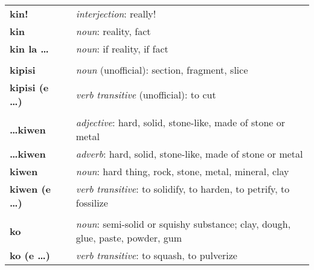 \begin{supertabular}{p{2,5cm}|ll}
    \textbf{kin!}                &  & \textit{interjection}: really!                                                                             \\
    \textbf{kin}                 &  & \textit{noun}: reality, fact                                                                               \\
    \textbf{kin la \dots}        &  & \textit{noun}: if reality, if fact                                                                         \\
                                 &  &                                                                                                            \\ %
    \textbf{kipisi }             &  & \textit{noun} (unofficial): section, fragment, slice                                                       \\
    \textbf{kipisi (e \dots)}    &  & \textit{verb transitive} (unofficial): to cut                                                              \\
                                 &  &                                                                                                            \\ %
    \textbf{\dots kiwen}         &  & \textit{adjective}: hard, solid, stone-like, made of stone or metal                                        \\
    \textbf{\dots kiwen}         &  & \textit{adverb}: hard, solid, stone-like, made of stone or metal                                           \\
    \textbf{kiwen}               &  & \textit{noun}: hard thing, rock, stone, metal, mineral, clay                                               \\
    \textbf{kiwen (e \dots)}     &  & \textit{verb transitive}: to solidify, to harden, to petrify, to fossilize                                 \\
                                 &  &                                                                                                            \\ %
    \textbf{ko}                  &  & \textit{noun}: semi-solid or squishy substance; clay, dough, glue, paste, powder, gum                      \\
    \textbf{ko (e \dots)}        &  & \textit{verb transitive}: to squash, to pulverize                                                          \\

\end{supertabular}
